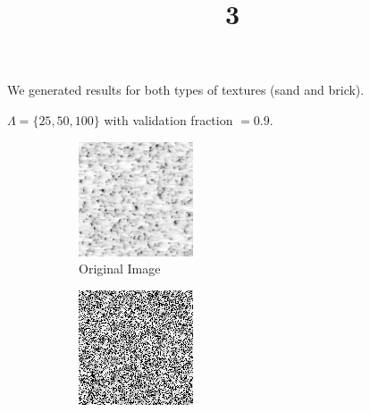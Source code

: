 \documentclass[a4paper]{article}
\title{3}
\date{}
\begin{document}
\maketitle
We generated results for both types of textures (sand and brick).

$\Lambda = \{25,50,100\}$ with validation fraction $= 0.9$.
\begin{figure}[H]
	\centering
	\begin{subfigure}{0.23\linewidth}
		\centering
		\includegraphics[width=\linewidth]{../media/Q3 textture_sand cropped.png}
		\caption{Original Image}
	\end{subfigure}
	\begin{subfigure}{0.23\linewidth}
		\centering
		\includegraphics[width=\linewidth]{../media/Q3 textture_sand all measurements.png}

\end{subfigure}
\end{figure}
\end{document}
